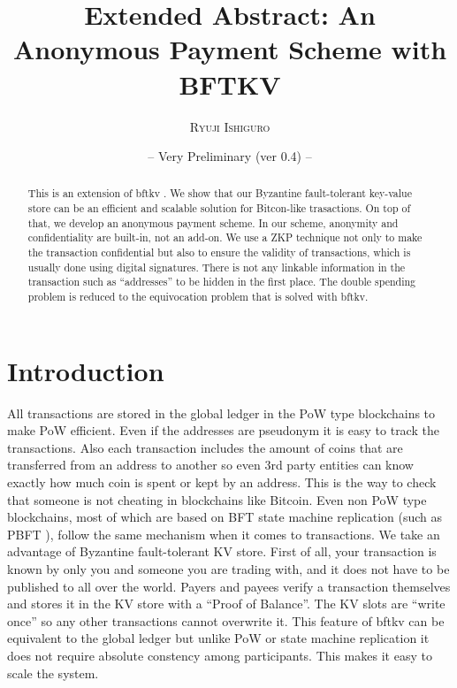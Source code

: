 \documentclass[10pt,fleqn]{article}
\title{Extended Abstract: An Anonymous Payment Scheme with BFTKV}
\author{%
  \textsc{Ryuji Ishiguro}\\%
}
\date{{\small -- Very Preliminary (ver 0.4) --}}
\begin{document}
\maketitle

\begin{abstract}

This is an extension of \textsf{bftkv} \cite{bftkv}. We show that our Byzantine fault-tolerant key-value store can be an efficient and scalable solution for Bitcon-like trasactions. On top of that, we develop an anonymous payment scheme. In our scheme, anonymity and confidentiality are built-in, not an add-on. We use a ZKP technique not only to make the transaction confidential but also to ensure the validity of transactions, which is usually done using digital signatures. There is not any linkable information in the transaction such as ``addresses'' to be hidden in the first place. The double spending problem is reduced to the equivocation problem that is solved with \textsf{bftkv}.

\end{abstract}

\section{Introduction}
All transactions are stored in the global ledger in the PoW type blockchains to make PoW efficient. Even if the addresses are pseudonym it is easy to track the transactions. Also each transaction includes the amount of coins that are transferred from an address to another so even 3rd party entities can know exactly how much coin is spent or kept by an address. This is the way to check that someone is not cheating in blockchains like Bitcoin. Even non PoW type blockchains, most of which are based on BFT state machine replication (such as PBFT \cite{pbft}), follow the same mechanism when it comes to transactions. We take an advantage of Byzantine fault-tolerant KV store. First of all, your transaction is known by only you and someone you are trading with, and it does not have to be published to all over the world. Payers and payees verify a transaction themselves and stores it in the KV store with a ``Proof of Balance''. The KV slots are ``write once'' so any other transactions cannot overwrite it. This feature of \textsf{bftkv} can be equivalent to the global ledger but unlike PoW or state machine replication it does not require absolute constency among participants. This makes it easy to scale the system. 
\end{document}
